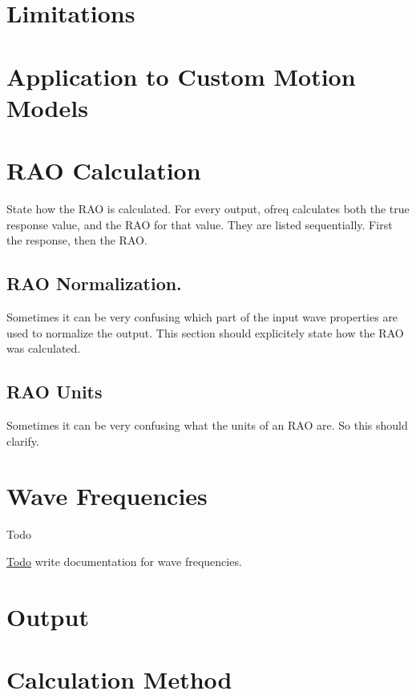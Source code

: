 \section*{Limitations}

\section*{Application to Custom Motion Models}

\section*{R\-A\-O Calculation}

State how the R\-A\-O is calculated. For every output, ofreq calculates both the true response value, and the R\-A\-O for that value. They are listed sequentially. First the response, then the R\-A\-O.

\subsection*{R\-A\-O Normalization.}

Sometimes it can be very confusing which part of the input wave properties are used to normalize the output. This section should explicitely state how the R\-A\-O was calculated.

\subsection*{R\-A\-O Units}

Sometimes it can be very confusing what the units of an R\-A\-O are. So this should clarify. \hypertarget{wave_frequencies}{}\section{Wave Frequencies}\label{wave_frequencies}
\begin{DoxyRefDesc}{Todo}
\item[\hyperlink{todo__todo000032}{Todo}]write documentation for wave frequencies. \end{DoxyRefDesc}


\section*{Output}

\section*{Calculation Method}

